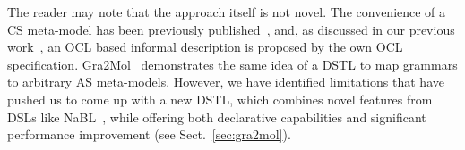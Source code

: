 \documentclass{llncs}
\begin{document}
The reader may note that the approach itself is not novel. The convenience of a CS meta-model has been previously published~\cite{muller2006csMetamodel}, and, as discussed in our previous work~\cite{sanchez2015oclCS2AS}, an OCL based informal description is proposed by the own OCL specification. Gra2Mol~\cite{canovas2012gra2mol} demonstrates the same idea of a DSTL to map grammars to arbitrary AS meta-models. However, we have identified limitations that have pushed us to come up with a new DSTL, which combines novel features from DSLs like NaBL~\cite{konat2013decNameRes}, while offering both declarative capabilities and significant performance improvement (see Sect.~\ref{sec:gra2mol}).






\end{document}
